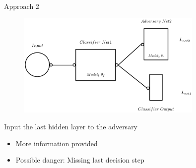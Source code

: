 \begin{frame}{Approach 2}
\begin{figure}
    \centering
    \includegraphics[width=0.8\textwidth]{figures_theory/ANN_sketch.png}
\end{figure}
    \begin{block}{Input the last hidden layer to the adversary}
        \begin{itemize}
            \item More information provided
            \item Possible danger: Missing last decision step
        \end{itemize}
    \end{block}
\end{frame}


